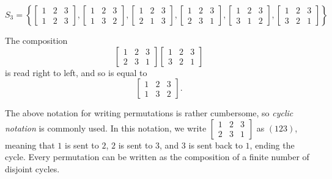 \begin{exmp}
    \[S_3 = \left\{
        \begin{bmatrix}
            1 & 2 & 3 \\ 1 & 2 & 3
        \end{bmatrix},
        \begin{bmatrix}
            1 & 2 & 3 \\ 1 & 3 & 2
        \end{bmatrix},
        \begin{bmatrix}
            1 & 2 & 3 \\ 2 & 1 & 3
        \end{bmatrix},
        \begin{bmatrix}
            1 & 2 & 3 \\ 2 & 3 & 1
        \end{bmatrix},
        \begin{bmatrix}
            1 & 2 & 3 \\ 3 & 1 & 2
        \end{bmatrix},
        \begin{bmatrix}
            1 & 2 & 3 \\ 3 & 2 & 1
        \end{bmatrix}
    \right\}\]

    The composition
    \[\begin{bmatrix}
        1 & 2 & 3 \\ 2 & 3 & 1
    \end{bmatrix}
    \begin{bmatrix}
        1 & 2 & 3 \\ 3 & 2 & 1
    \end{bmatrix}\] is read right to left, and so is equal to
    \[\begin{bmatrix}
        1 & 2 & 3 \\ 1 & 3 & 2
    \end{bmatrix}.\]
\end{exmp}

\begin{defn}
    The above notation for writing permutations is rather cumbersome, so \emph{cyclic notation} is commonly used. In this notation, we write $\begin{bmatrix}
        1 & 2 & 3 \\ 2 & 3 & 1
    \end{bmatrix}$ as $(123)$, meaning that $1$ is sent to $2$, $2$ is sent to $3$, and $3$ is sent back to $1$, ending the cycle. Every permutation can be written as the composition of a finite number of disjoint cycles.
\end{defn}


